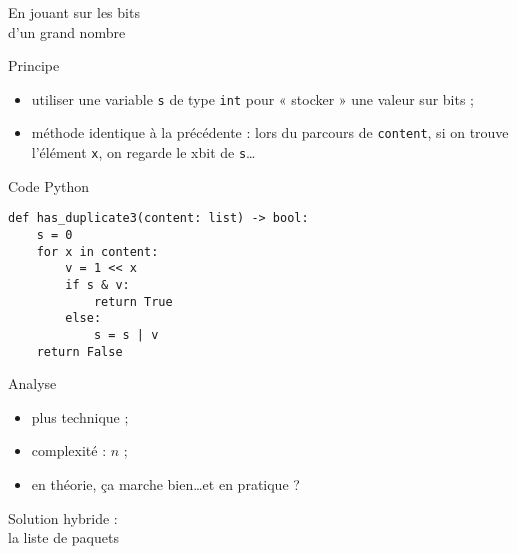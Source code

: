 \documentclass[12pt]{nsibeamer}
\begin{document}
%

\begin{frame}[standout]
	\begin{center}
		\Huge
		En jouant sur les bits\\
		d'un grand nombre
		\normalsize
	\end{center}
\end{frame}

%

\begin{frame}[fragile]{Principe}
\pause
\begin{itemize}
	\item utiliser une variable \texttt{s} de type \texttt{int} pour « stocker » une valeur sur  bits ;\pause
	\item méthode identique à la précédente : lors du parcours de \texttt{content}, si on trouve l'élément \texttt{x}, on regarde le x\eme bit de \texttt{s}\ldots
\end{itemize}
\end{frame}

%

\begin{frame}[fragile]{Code Python}
\begin{verbatim}
def has_duplicate3(content: list) -> bool:
    s = 0
    for x in content:
        v = 1 << x
        if s & v:
            return True
        else:
            s = s | v
    return False
\end{verbatim}
\end{frame}

%

\begin{frame}[fragile]{Analyse}
\pause
\begin{itemize}
	\item plus technique ;\pause
	\item complexité : $n$ ;\pause
	\item en théorie, ça marche bien\ldots\pause et en pratique ?
\end{itemize}
\end{frame}

%

\begin{frame}[standout]
	\begin{center}
		\Huge
		Solution hybride : \\
		la liste de paquets
	\end{center}
\end{frame}
\end{document}
